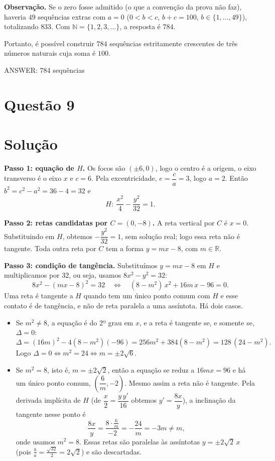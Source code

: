 \documentclass{article}%
\begin{document}
\textbf{Observação.} Se o zero fosse admitido (o que a convenção da prova não faz), haveria $49$ sequências extras com $a=0$ ($0<b<c$, $b+c=100$, $b \in \{1,\ldots,49\}$), totalizando $833$. Com $\mathbb{N}=\{1,2,3,\ldots\}$, a resposta é $784$.

Portanto, é possível construir $784$ sequências estritamente crescentes de três números naturais cuja soma é $100$.

ANSWER: 784 sequências%
\newpage%
\section*{Questão 9}

\section*{Solução}

\textbf{Passo 1: equação de $H$.} Os focos são $(\pm 6,0)$, logo o centro é a origem, o eixo transverso é o eixo $x$ e $c=6$. Pela excentricidade, $e=\dfrac{c}{a}=3$, logo $a=2$. Então $b^2=c^2-a^2=36-4=32$ e
\[
H:\ \frac{x^2}{4}-\frac{y^2}{32}=1 .
\]

\textbf{Passo 2: retas candidatas por $C=(0,-8)$.} A reta vertical por $C$ é $x=0$. Substituindo em $H$, obtemos $-\dfrac{y^2}{32}=1$, sem solução real; logo essa reta não é tangente. Toda outra reta por $C$ tem a forma $y=mx-8$, com $m\in\mathbb{R}$.

\textbf{Passo 3: condição de tangência.} Substituímos $y=mx-8$ em $H$ e multiplicamos por $32$, ou seja, usamos $8x^2-y^2=32$:
\[
8x^2-(mx-8)^2=32 \quad\Longleftrightarrow\quad (8-m^2)\,x^2+16m\,x-96=0 .
\]
Uma reta é tangente a $H$ quando tem um único ponto comum com $H$ e esse contato é de tangência, e não de reta paralela a uma assíntota. Há dois casos.

\begin{itemize}
\item Se $m^2\neq 8$, a equação é do 2º grau em $x$, e a reta é tangente se, e somente se, $\Delta=0$:
\[
\Delta=(16m)^2-4(8-m^2)(-96)=256m^2+384(8-m^2)=128\,(24-m^2).
\]
Logo $\Delta=0 \Leftrightarrow m^2=24 \Leftrightarrow m=\pm 2\sqrt{6}$.

\item Se $m^2=8$, isto é, $m=\pm 2\sqrt{2}$, então a equação se reduz a $16mx=96$ e há um único ponto comum, $\left(\dfrac{6}{m},-2\right)$. Mesmo assim a reta não é tangente. Pela derivada implícita de $H$ (de $\dfrac{x}{2}=\dfrac{y\,y'}{16}$ obtemos $y'=\dfrac{8x}{y}$), a inclinação da tangente nesse ponto é
\[
\frac{8x}{y}=\frac{8\cdot\frac{6}{m}}{-2}=-\frac{24}{m}=-3m\neq m ,
\]
onde usamos $m^2=8$. Essas retas são paralelas às assíntotas $y=\pm 2\sqrt{2}\,x$ (pois $\frac{b}{a}=\frac{\sqrt{32}}{2}=2\sqrt{2}$) e são descartadas.
\end{itemize}
\end{document}
